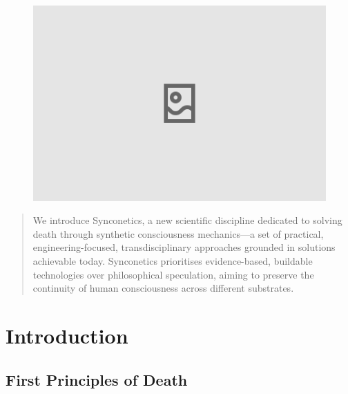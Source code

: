 \documentclass[10pt]{article}
\begin{document}
\begin{sloppypar}

  \begin{figure}[ht]
    \centering
    \includegraphics[width=\textwidth]{figures/cover.png}
    \label{fig:cover}
  \end{figure}
  \newpage


  \begin{abstract}
    We introduce Synconetics, a new scientific discipline dedicated to solving death through synthetic consciousness mechanics—a set of practical, engineering-focused, transdisciplinary approaches grounded in solutions achievable today. Synconetics prioritises evidence-based, buildable technologies over philosophical speculation, aiming to preserve the continuity of human consciousness across different substrates.
  \end{abstract}

  \pagebreak
  \tableofcontents
  \pagebreak
  \listoffigures
  \pagebreak
  \listoftables
  \pagebreak
  \lstlistoflistings
  \pagebreak


  \section{Introduction}
  \label{sec:introduction}

  \subsection{First Principles of Death}
  \label{sec:first-principles}


\end{sloppypar}
\end{document}
